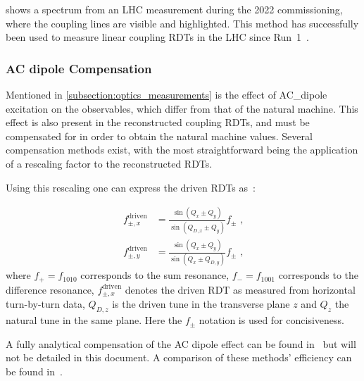  shows a spectrum from an LHC measurement during the \num{2022} commissioning, where the coupling lines are visible and highlighted.
This method has successfully been used to measure linear coupling RDTs in the LHC since Run~\num{1}~\cite{PRAB:Benedikt:Driving_Term_Experiments_CERN,IPAC:Persson:Automatic_Coupling_Correction_LHC_Injection_Oscillations,IPAC:Miyamoto:Measurement_Coupling_RDTs_LHC_AC_Dipole}.

\subsubsection*{AC dipole Compensation}

Mentioned in \cref{subsection:optics_measurements} is the effect of \gls{AC_dipole} excitation on the observables, which differ from that of the natural machine.
This effect is also present in the reconstructed coupling \glspl{RDT}, and must be compensated for in order to obtain the natural machine values.
Several compensation methods exist, with the most straightforward being the application of a rescaling factor to the reconstructed \glspl{RDT}.

Using this rescaling one can express the driven \glspl{RDT} as~\cite{IPAC:Wegscheider:Forced_Coupling_Resonance_Driving_Terms}:

\begin{equation}
  \begin{aligned}
    f_{\pm, x}^{\mathrm{driven}} &= \frac{\sin \left( Q_x \pm Q_y \right)}{\sin \left( Q_{D,x} \pm Q_y \right)} f_{\pm} \text{ ,} \\
    f_{\pm, y}^{\mathrm{driven}} &= \frac{\sin \left( Q_x \pm Q_y \right)}{\sin \left( Q_x \pm Q_{D,y} \right)} f_{\pm} \text{ ,}
  \end{aligned}
  \label{equation:rescaling_coupling_rdts}
\end{equation}
where \(f_{+} = f_{1010}\) corresponds to the sum resonance, \(f_{-} = f_{1001}\) corresponds to the difference resonance, \(f_{\pm, x}^{\mathrm{driven}}\) denotes the driven \gls{RDT} as measured from horizontal turn-by-turn data, \(Q_{D, z}\) is the driven tune in the transverse plane \(z\) and \(Q_z\) the natural tune in the same plane.
Here the \(f_{\pm}\) notation is used for concisiveness.

A fully analytical compensation of the AC dipole effect can be found in~\cite{REPORT:Miyamoto:Measurement_Coupling_Resonance_Driving_Terms,IPAC:Miyamoto:Measurement_Coupling_RDTs_LHC_AC_Dipole} but will not be detailed in this document.
A comparison of these methods' efficiency can be found in~\cite{IPAC:Wegscheider:NBPM_Momentum_Reconstruction_for_Linear_Coupling_RDTs}.

